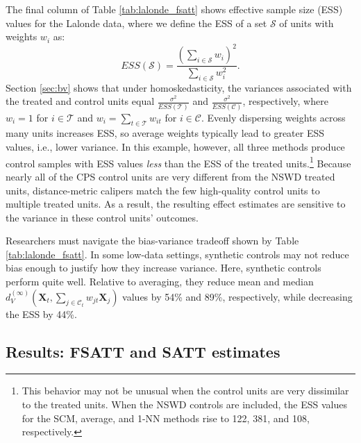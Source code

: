 \documentclass{article}
\newcommand{\Xt}{\mathbf{X}_t}
\newcommand{\Xj}{\mathbf{X}_j}
\newcommand{\Ct}{\mathcal{C}_{t}}
\begin{document}
The final column of Table \ref{tab:lalonde_fsatt} shows effective sample size (ESS) values for the Lalonde data, where we define the ESS of a set $\mathcal{S}$ of units with weights $w_i$ as: 
$$ESS(\mathcal{S}) = \frac{(\sum_{i \in \mathcal{S}} w_i)^2}{\sum_{i \in \mathcal{S}} w_i^2}.$$
Section \ref{sec:bv} shows that under homoskedasticity, the variances associated with the treated and control units equal $\frac{\sigma^2}{ESS(\mathcal{T})}$ and $\frac{\sigma^2}{ESS(\mathcal{C})}$, respectively, where $w_i = 1$ for $i \in \mathcal{T}$ and $w_i = \sum_{t \in \mathcal{T}} w_{it}$ for $i \in \mathcal{C}$.
Evenly dispersing weights across many units increases ESS, so average weights typically lead to greater ESS values, i.e., lower variance.
In this example, however, all three methods produce control samples with ESS values \textit{less} than the ESS of the treated units.\footnote{This behavior may not be unusual when the control units are very dissimilar to the treated units. When the NSWD controls are included, the ESS values for the SCM, average, and 1-NN methods rise to 122, 381, and 108, respectively.}
Because nearly all of the CPS control units are very different from the NSWD treated units, distance-metric calipers match the few high-quality control units to multiple treated units.
As a result, the resulting effect estimates are sensitive to the variance in these control units' outcomes.

Researchers must navigate the bias-variance tradeoff shown by Table \ref{tab:lalonde_fsatt}.
In some low-data settings, synthetic controls may not reduce bias enough to justify how they increase variance.
Here, synthetic controls perform quite well.
Relative to averaging, they reduce mean and median $d_V^{(\infty)}(\Xt, \sum_{j \in \Ct} w_{jt} \Xj)$ values by 54\% and 89\%, respectively, while decreasing the ESS by 44\%.


\subsection{Results: FSATT and SATT estimates}
\label{sec:lalonde_bv}
\end{document}
